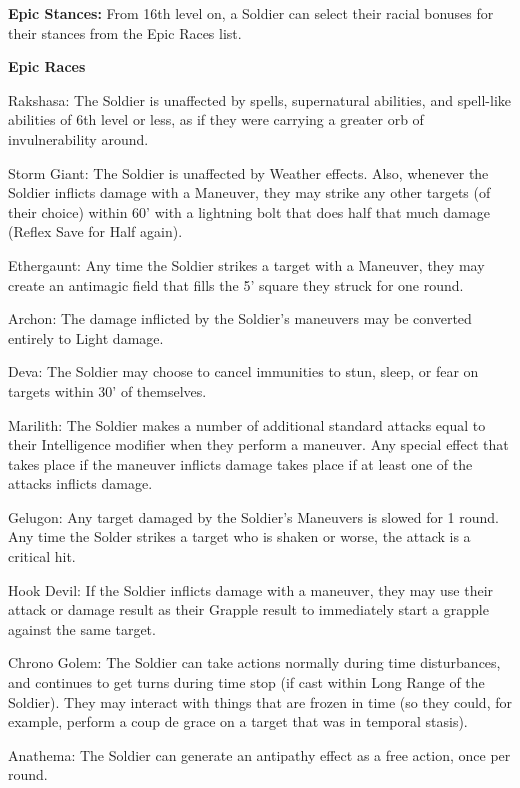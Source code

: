\textbf{Epic Stances:} From 16th level on, a Soldier can select their racial bonuses for their stances from the Epic Races list.

\textbf{Epic Races}
\begin{description*}
\item[Rakshasa:] The Soldier is unaffected by spells, supernatural abilities, and spell-like abilities of 6th level or less, as if they were carrying a greater orb of invulnerability around.
\item[Storm Giant:] The Soldier is unaffected by Weather effects. Also, whenever the Soldier inflicts damage with a Maneuver, they may strike any other targets (of their choice) within 60' with a lightning bolt that does half that much damage (Reflex Save for Half again).
\item[Ethergaunt:] Any time the Soldier strikes a target with a Maneuver, they may create an antimagic field that fills the 5' square they struck for one round.
\item[Archon:] The damage inflicted by the Soldier's maneuvers may be converted entirely to Light damage.
\item[Deva:] The Soldier may choose to cancel immunities to stun, sleep, or fear on targets within 30' of themselves.
\item[Marilith:] The Soldier makes a number of additional standard attacks equal to their Intelligence modifier when they perform a maneuver. Any special effect that takes place if the maneuver inflicts damage takes place if at least one of the attacks inflicts damage.
\item[Gelugon:] Any target damaged by the Soldier's Maneuvers is slowed for 1 round. Any time the Solder strikes a target who is shaken or worse, the attack is a critical hit.
\item[Hook Devil:] If the Soldier inflicts damage with a maneuver, they may use their attack or damage result as their Grapple result to immediately start a grapple against the same target.
\item[Chrono Golem:] The Soldier can take actions normally during time disturbances, and continues to get turns during time stop (if cast within Long Range of the Soldier). They may interact with things that are frozen in time (so they could, for example, perform a coup de grace on a target that was in temporal stasis).
\item[Anathema:] The Soldier can generate an antipathy effect as a free action, once per round.
\end{description*}

